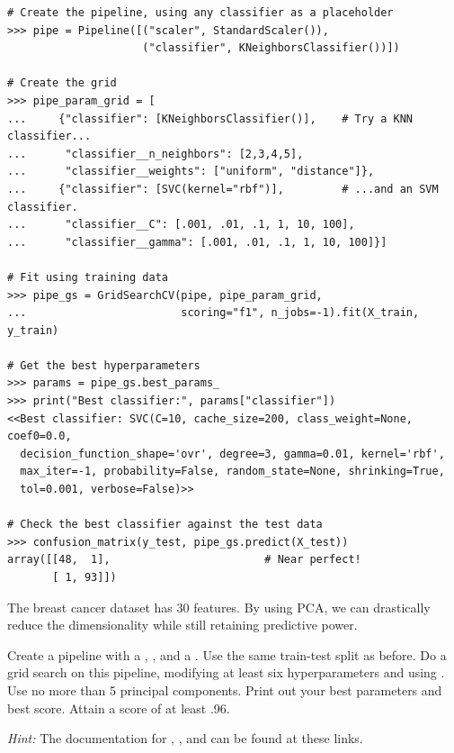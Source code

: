 \begin{lstlisting}
# Create the pipeline, using any classifier as a placeholder
>>> pipe = Pipeline([("scaler", StandardScaler()),
                     ("classifier", KNeighborsClassifier())])

# Create the grid
>>> pipe_param_grid = [
...     {"classifier": [KNeighborsClassifier()],    # Try a KNN classifier...
...      "classifier__n_neighbors": [2,3,4,5],
...      "classifier__weights": ["uniform", "distance"]},
...     {"classifier": [SVC(kernel="rbf")],         # ...and an SVM classifier.
...      "classifier__C": [.001, .01, .1, 1, 10, 100],
...      "classifier__gamma": [.001, .01, .1, 1, 10, 100]}]

# Fit using training data
>>> pipe_gs = GridSearchCV(pipe, pipe_param_grid,
...                        scoring="f1", n_jobs=-1).fit(X_train, y_train)

# Get the best hyperparameters
>>> params = pipe_gs.best_params_
>>> print("Best classifier:", params["classifier"])
<<Best classifier: SVC(C=10, cache_size=200, class_weight=None, coef0=0.0,
  decision_function_shape='ovr', degree=3, gamma=0.01, kernel='rbf',
  max_iter=-1, probability=False, random_state=None, shrinking=True,
  tol=0.001, verbose=False)>>

# Check the best classifier against the test data
>>> confusion_matrix(y_test, pipe_gs.predict(X_test))
array([[48,  1],                        # Near perfect!
       [ 1, 93]])
\end{lstlisting}

\begin{problem} %
The breast cancer dataset has 30 features.
By using PCA, we can drastically reduce the dimensionality while still retaining predictive power.

Create a pipeline with a , , and a .
Use the same train-test split as before.
Do a grid search on this pipeline, modifying at least six hyperparameters and using .
Use no more than 5 principal components.
Print out your best parameters and best score.
Attain a score of at least .96.

\emph{Hint:} The documentation for \href{https://scikit-learn.org/stable/modules/generated/sklearn.preprocessing.StandardScaler.html}{}, \href{https://scikit-learn.org/stable/modules/generated/sklearn.decomposition.PCA.html}{}, and \href{https://scikit-learn.org/stable/modules/generated/sklearn.neighbors.KNeighborsClassifier.html}{} can be found at these links.
\end{problem}





